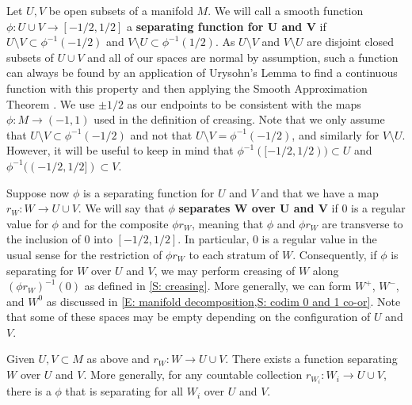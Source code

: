 \begin{definition}\label{D: separating function}
	Let $U,V$ be open subsets of a manifold $M$.
	We will call a smooth function $\phi \colon U \cup V \to [-1/2,1/2]$ a \textbf{separating function for $\mathbf U$ and $\mathbf V$} if $U\setminus V \subset \phi^{-1}(-1/2)$ and $V\setminus U \subset \phi^{-1}(1/2)$.
	As $U \setminus V$ and $V \setminus U$ are disjoint closed subsets of $U \cup V$ and all of our spaces are normal by assumption, such a function can always be found by an application of Urysohn's Lemma to find a continuous function with this property and then applying the Smooth Approximation Theorem \cite[Theorem III.2.5]{Kos93}.
	We use $\pm 1/2$ as our endpoints to be consistent with the maps $\phi \colon M \to (-1,1)$ used in the definition of creasing.
	Note that we only assume that $U \setminus V \subset \phi^{-1}(-1/2)$ and not that $U \setminus V = \phi^{-1}(-1/2)$, and similarly for $V \setminus U$.
	However, it will be useful to keep in mind that $\phi^{-1}([-1/2,1/2)) \subset U$ and $\phi^{-1}((-1/2,1/2]) \subset V$.

	Suppose now $\phi$ is a separating function for $U$ and $V$ and that we have a map $r_W \colon W \to U \cup V$.
	We will say that $\phi$ \textbf{separates $\mathbf W$ over $\mathbf U$ and $\mathbf V$} if $0$ is a regular value for $\phi$ and for the composite $\phi r_W$, meaning that $\phi$ and $\phi r_W$ are transverse to the inclusion of $0$ into $[-1/2,1/2]$.
	In particular, $0$ is a regular value in the usual sense for the restriction of $\phi r_W$ to each stratum of $W$.
	Consequently, if $\phi$ is separating for $W$ over $U$ and $V$, we may perform creasing of $W$ along $(\phi r_W)^{-1}(0)$ as defined in \cref{S: creasing}.
	More generally, we can form $W^+$, $W^-$, and $W^0$ as discussed in \cref{E: manifold decomposition,S: codim 0 and 1 co-or}.
	Note that some of these spaces may be empty depending on the configuration of $U$ and $V$.
\end{definition}

\begin{lemma}\label{L: existence of separating}
	Given $U,V \subset M$ as above and $r_W \colon W \to U \cup V$.
	There exists a function separating $W$ over $U$ and $V$.
	More generally, for any countable collection $r_{W_i} \colon W_i \to U \cup V$, there is a $\phi$ that is separating for all $W_i$ over $U$ and $V$.
\end{lemma}

